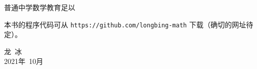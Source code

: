 普通中学数学教育足以


本书的程序代码可从 \verb|https://github.com/longbing-math| 下载（确切的网址待定）。


{\kaishu
	\begin{center}
		\hspace*{88mm}龙\,   冰\\
		\hspace*{88mm}2021年~10月
	\end{center}
}

%

